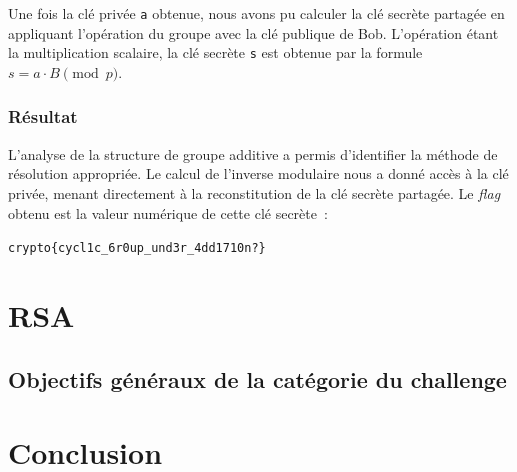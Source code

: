 \documentclass[12pt, a4paper]{article}
\begin{document}
            Une fois la clé privée \texttt{a} obtenue, nous avons pu calculer la clé secrète partagée en appliquant l'opération du groupe avec la clé publique de Bob. L'opération étant la multiplication scalaire, la clé secrète \texttt{s} est obtenue par la formule $s = a \cdot B \pmod{p}$.
            
            \subsubsection{Résultat}
            
            L'analyse de la structure de groupe additive a permis d'identifier la méthode de résolution appropriée. Le calcul de l'inverse modulaire nous a donné accès à la clé privée, menant directement à la reconstitution de la clé secrète partagée. Le \textit{flag} obtenu est la valeur numérique de cette clé secrète~:

\begin{center}
    \texttt{crypto\{cycl1c\_6r0up\_und3r\_4dd1710n?\}}
\end{center}

\section{RSA}
    \subsection{Objectifs généraux de la catégorie du challenge}


\section{Conclusion}
\end{document}
